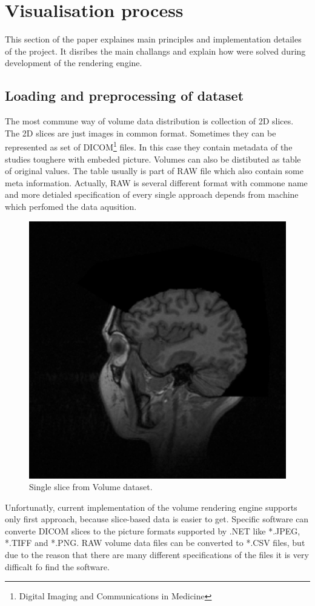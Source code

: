\documentclass[twoside, english, 11pt]{report}
\begin{document}
\section{Visualisation process}

This section of the paper explaines main principles and implementation detailes of the project. It disribes the main challangs and explain how were solved during development of the rendering engine.

\subsection{Loading and preprocessing of dataset}
The most commune way of volume data distribution is collection of 2D slices. The 2D slices are just images in common format. Sometimes they can be represented as set of DICOM\footnote{Digital Imaging and Communications in Medicine} files. In this case they contain metadata of the studies toughere with embeded picture. Volumes can also be distibuted as table of original values. The table usually is part of RAW file which also contain some meta information. Actually, RAW is several different format with commone name and more detialed specification of every single approach depends from machine which perfomed the data aqusition.\\
\begin{figure}[!h]
\centerline{\includegraphics[scale = 0.35]{img/slice}}
\caption{Single slice from Volume dataset.\label{fig:slice}}
\end{figure}
Unfortunatly, current implementation of the volume rendering engine supports only first approach, because slice-based data is easier to get. Specific software can converte DICOM slices to the picture formats supported by .NET like *.JPEG, *.TIFF and *.PNG. RAW volume data files can be converted to *.CSV files, but due to the reason that there are many different specifications of the files it is very difficalt fo find the software.\\
\end{document}
